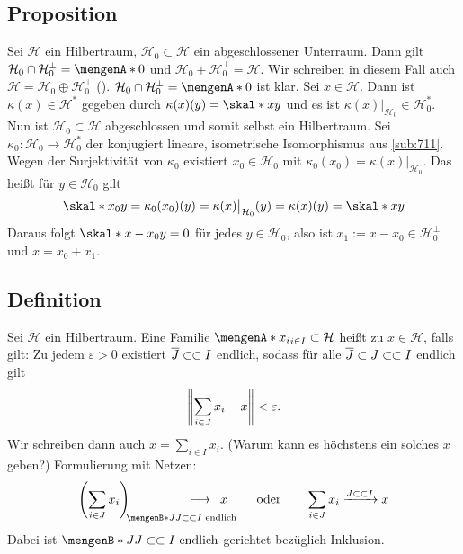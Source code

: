 \subsection[Proposition: Für einen abgeschlossenen Unterraum $\mathcal{H}_0$ gilt $\mathcal{H}= \mathcal{H}_0 \oplus \mathcal{H}_0^\bot$]{Proposition} %
\label{sub:715}
Sei $\mathcal{H}$ ein Hilbertraum, $\mathcal{H}_0 \subset \mathcal{H}$ ein abgeschlossener Unterraum. Dann gilt $\mathcal{H}_0 \cap \mathcal{H}_0^\bot = \set{0}$ und 
$\mathcal{H}_0 + \mathcal{H}_0^\bot = \mathcal{H}$. Wir schreiben in diesem Fall auch $\mathcal{H} = \mathcal{H}_0 \oplus \mathcal{H}_0^\bot$ ().
$\mathcal{H}_0 \cap \mathcal{H}_0^\bot= \set{0}$ ist klar. Sei $x \in \mathcal{H}$. Dann ist $\kappa(x) \in \mathcal{H}^*$ gegeben durch 
$\kappa(x)(y)=\skal*{x}{y}$ und es ist $\kappa(x)|_{\mathcal{H}_0} \in \mathcal{H}_0^*$. Nun ist $\mathcal{H}_0 \subset \mathcal{H}$ abgeschlossen und somit selbst ein 
Hilbertraum. Sei $\kappa_0 \colon \mathcal{H}_0 \to \mathcal{H}_0^*$ der konjugiert lineare, isometrische Isomorphismus aus \ref{sub:711}. Wegen der Surjektivität von 
$\kappa_0$ existiert $x_0 \in \mathcal{H}_0$ mit $\kappa_0(x_0)= \kappa(x)|_{\mathcal{H}_0}$. Das heißt für $y \in \mathcal{H}_0$ gilt 
\begin{align*}
	\skal*{x_0}{y} = \kappa_0(x_0)(y) = \kappa(x)\big|_{\mathcal{H}_0}(y) = \kappa(x)(y) = \skal*{x}{y}
\end{align*}
Daraus folgt $\skal*{x-x_0}{y}=0$ für jedes $y \in \mathcal{H}_0$, also ist $x_1 := x-x_0 \in \mathcal{H}_0^\bot$ und $x=x_0+x_1$. \bewende

\subsection[Definition: Summierbare Familie (in einem Hilbertraum)]{Definition} %
\label{sub:716}
Sei $\mathcal{H}$ ein Hilbertraum. Eine Familie $\set{x_i}_{i \in I} \subset \mathcal{H}$ heißt  zu $x \in \mathcal{H}$, falls gilt: 
Zu jedem $\varepsilon>0$ existiert $\overline{J} \subset\mkern-0.7mu \subset I$ endlich, sodass für alle $\overline{J} \subset J \subset\mkern-0.7mu \subset I$ endlich gilt 
\[
	\norm{\sum_{i \in J}x_i - x } < \varepsilon.
\]
Wir schreiben dann auch $x= \sum_{i \in I} x_i$. (Warum kann es höchstens ein solches $x$ geben?) Formulierung mit Netzen: 
\[
	\enbrace*{\sum_{i \in J} x_i}_{\!\!\set[J]{J \finSub I \text{ endlich}}} \hspace{-4em} \longrightarrow \enspace x \qquad \text{ oder} \qquad \sum_{i \in J}x_i \xrightarrow{J \finSub I} x 
\]
Dabei ist $\set[J]{J \finSub I \text{ endlich}}$ gerichtet bezüglich Inklusion.

